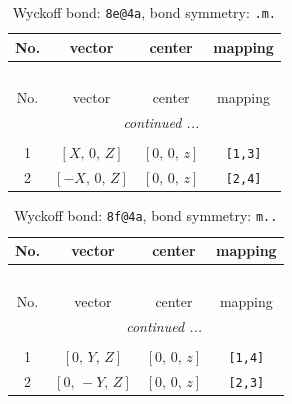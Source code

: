 \documentclass[fleqn,8pt]{jsarticle}
\begin{document}
\begin{longtable}{cccc}
\caption{Wyckoff bond: {\tt 8e@4a}, bond symmetry: {\tt .m.}}
 \\
 \hline \hline
No. & vector & center & mapping \\ \hline \endfirsthead

\multicolumn{3}{l}{\tablename\ \thetable{}} \\
 \hline \hline
No. & vector & center & mapping \\ \hline \endhead

 \hline \hline
\multicolumn{3}{r}{\footnotesize\it continued ...} \\ \endfoot

 \hline \hline
\multicolumn{3}{r}{} \\ \endlastfoot

1 & $\left[ X,\, 0,\, Z \right]$ & $\left[ 0,\, 0,\, z \right]$ & {\tt [1,3]} \\ \hline
2 & $\left[ - X,\, 0,\, Z \right]$ & $\left[ 0,\, 0,\, z \right]$ & {\tt [2,4]} \\
\end{longtable}
\renewcommand{\arraystretch}{1.2}
\begin{longtable}{cccc}
\caption{Wyckoff bond: {\tt 8f@4a}, bond symmetry: {\tt m..}}
 \\
 \hline \hline
No. & vector & center & mapping \\ \hline \endfirsthead

\multicolumn{3}{l}{\tablename\ \thetable{}} \\
 \hline \hline
No. & vector & center & mapping \\ \hline \endhead

 \hline \hline
\multicolumn{3}{r}{\footnotesize\it continued ...} \\ \endfoot

 \hline \hline
\multicolumn{3}{r}{} \\ \endlastfoot

1 & $\left[ 0,\, Y,\, Z \right]$ & $\left[ 0,\, 0,\, z \right]$ & {\tt [1,4]} \\ \hline
2 & $\left[ 0,\, - Y,\, Z \right]$ & $\left[ 0,\, 0,\, z \right]$ & {\tt [2,3]} \\
\end{longtable}
\renewcommand{\arraystretch}{1.2}
\end{document}
